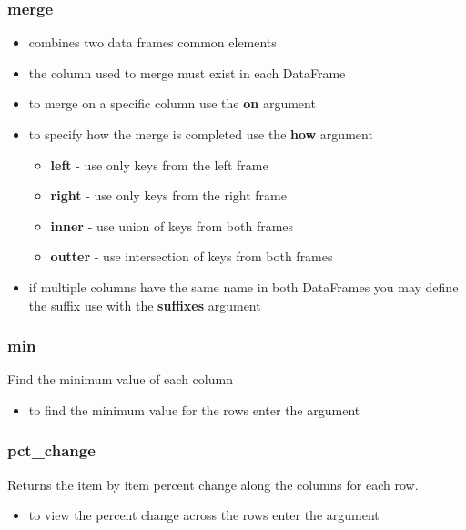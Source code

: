 \subsubsection{merge}
  \begin{itemize}
    \item combines two data frames common elements
    \item the column used to merge must exist in each DataFrame
    \item to merge on a specific column use the \textbf{on} argument
    \item to specify how the merge is completed use the \textbf{how} argument
      \begin{itemize}
        \item \textbf{left} - use only keys from the left frame
        \item \textbf{right} - use only keys from the right frame
        \item \textbf{inner} - use union of keys from both frames
        \item \textbf{outter} - use intersection of keys from both frames
      \end{itemize}
    \item if multiple columns have the same name in both DataFrames you may
      define the suffix use with the \textbf{suffixes} argument
  \end{itemize}

%
\subsubsection{min}
Find the minimum value of each column
  \begin{itemize}

    \item to find the minimum value for the rows enter the argument
      \color{red}{axis=1}
  \end{itemize}

%
\subsubsection{pct\_change}
Returns the item by item percent change along the columns for each row.
  \begin{itemize}

    \item to view the percent change across the rows enter the argument
      \color{red}{axis=1}
  \end{itemize}

